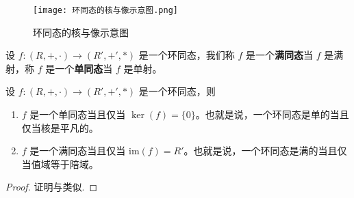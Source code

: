 \documentclass[../../main.tex]{subfiles}
\begin{document}
\begin{figure}[H]
\centering
\texttt{[image: 环同态的核与像示意图.png]}
\caption{环同态的核与像示意图}
\label{figure:环同态的核与像示意图}
\end{figure}

\begin{definition}[满同态与单同态]
设 $f:(R, +, \cdot) \to (R', +', *)$ 是一个环同态，我们称 $f$ 是一个\textbf{满同态}当 $f$ 是满射，称 $f$ 是一个\textbf{单同态}当 $f$ 是单射。 
\end{definition}

\begin{proposition}\label{proposition:一个环同态是单的当且仅当核是平凡的}
设  $f:(R, +, \cdot) \to (R', +', *)$ 是一个环同态，则
\begin{enumerate}
\item $f$ 是一个单同态当且仅当 $\ker(f)=\{0\}$。也就是说，一个环同态是单的当且仅当核是平凡的。

\item $f$ 是一个满同态当且仅当 $ \mathrm{im}(f)=R'$。也就是说，一个环同态是满的当且仅当值域等于陪域。
\end{enumerate}
\end{proposition}
\begin{proof}
证明与类似.
\end{proof}
\end{document}
